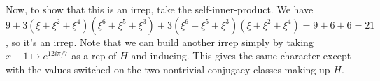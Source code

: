 \documentclass{article}
\begin{document}
Now, to show that this is an irrep, take the self-inner-product. We have $9+3(\xi+\xi^2+\xi^4)(\xi^6+\xi^5+\xi^3)+3(\xi^6+\xi^5+\xi^3)(\xi+\xi^2+\xi^4)=9+6+6=21$, so it's an irrep. Note that we can build another irrep simply by taking $x+1\mapsto e^{12i\pi/7}$ as a rep of $H$ and inducing. This gives the same character except with the values switched on the two nontrivial conjugacy classes making up $H$. 
\end{document}

